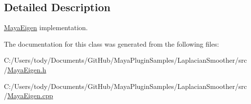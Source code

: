 \subsection{Detailed Description}
\hyperlink{class_maya_eigen}{Maya\+Eigen} implementation. 

The documentation for this class was generated from the following files\+:\begin{DoxyCompactItemize}
\item 
C\+:/\+Users/tody/\+Documents/\+Git\+Hub/\+Maya\+Plugin\+Samples/\+Laplacian\+Smoother/src/\hyperlink{_maya_eigen_8h}{Maya\+Eigen.\+h}\item 
C\+:/\+Users/tody/\+Documents/\+Git\+Hub/\+Maya\+Plugin\+Samples/\+Laplacian\+Smoother/src/\hyperlink{_maya_eigen_8cpp}{Maya\+Eigen.\+cpp}\end{DoxyCompactItemize}
